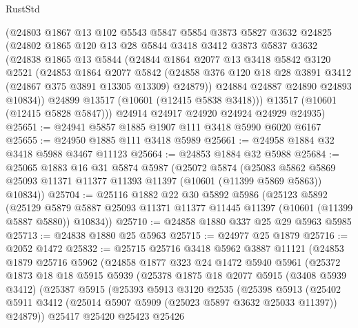 \begin{lexlean}{RustStd}
\begin{coremodule}
      (@24803
        @1867
        @13
        @102
        @5543
        @5847
        @5854
        @3873
        @5827
        @3632
        @24825
        (@24802
          @1865
          @120
          @13
          @28
          @5844
          @3418
          @3412
          @3873
          @5837
          @3632
          (@24838
            @1865
            @13
            @5844
            (@24844
              @1864
              @2077
              @13
              @3418
              @5842
              @3120
              @2521
              (@24853
                @1864
                @2077
                @5842
                (@24858 @376 @120 @18 @28 @3891 @3412 (@24867 @375 @3891 @13305 @13309) @24879))
              @24884
              @24887
              @24890
              @24893
              @10834))
          @24899
          @13517
          (@10601 (@12415 @5838 @3418)))
        @13517
        (@10601 (@12415 @5828 @5847)))
      @24914
      @24917
      @24920
      @24924
      @24929
      @24935)
@25651 := @24941 @5857 @1885 @1907 @111 @3418 @5990 @6020 @6167
@25655 := @24950 @1885 @111 @3418 @5989
@25661 := @24958 @1884 @32 @3418 @5988 @3467 @11123
@25664 := @24853 @1884 @32 @5988
@25684 := @25065
    @1883
    @16
    @31
    @5874
    @5987
    (@25072
      @5874
      (@25083 @5862 @5869 @25093 @11371 @11377 @11393 @11397 (@10601 (@11399 @5869 @5863)) @10834))
@25704 := @25116
    @1882
    @22
    @30
    @5892
    @5986
    (@25123
      @5892
      (@25129 @5879 @5887 @25093 @11371 @11377 @11445 @11397 (@10601 (@11399 @5887 @5880)) @10834))
@25710 := @24858 @1880 @337 @25 @29 @5963 @5985
@25713 := @24838 @1880 @25 @5963
@25715 := @24977 @25 @1879
@25716 := @2052 @1472
@25832 := @25715
    @25716
    @3418
    @5962
    @3887
    @11121
    (@24853
      @1879
      @25716
      @5962
      (@24858
        @1877
        @323
        @24
        @1472
        @5940
        @5961
        (@25372
          @1873
          @18
          @18
          @5915
          @5939
          (@25378
            @1875
            @18
            @2077
            @5915
            (@3408 @5939 @3412)
            (@25387
              @5915
              (@25393
                @5913
                @3120
                @2535
                (@25398
                  @5913
                  (@25402
                    @5911
                    @3412
                    (@25014 @5907 @5909 (@25023 @5897 @3632 @25033 @11397))
                    @24879))
                @25417
                @25420
                @25423
                @25426

\end{coremodule}
\end{lexlean}
